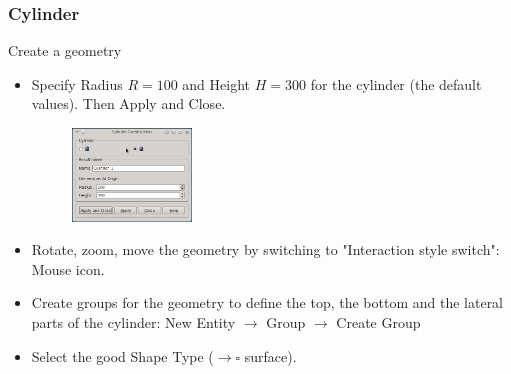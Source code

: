 \documentclass[10pt]{beamer}
\begin{document}
\begin{frame}
\frametitle{Cylinder}
\begin{block}{Create a geometry}

\begin{itemize}
\item Specify Radius $R=100$ and Height $H=300$ for the cylinder (the default values). Then Apply and Close.
\begin{figure}
\includegraphics[width=0.3\textwidth]{PICTURES/salome2.jpg}
\end{figure}

\item Rotate, zoom, move the geometry by switching to "Interaction style switch": Mouse icon.

\item Create groups for the geometry to define the top, the bottom and the lateral parts of the cylinder: New Entity $\rightarrow$ Group $\rightarrow$ Create Group

\item Select the good Shape Type ($\rightarrow \square$ surface).
\end{itemize}

\end{block}
\end{frame}
\end{document}

